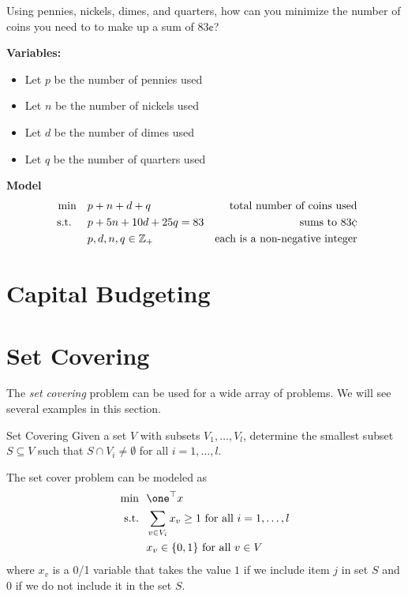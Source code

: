 \begin{example}
\label{ex:min-coins}
Using pennies, nickels, dimes, and quarters, how can you minimize the number of coins you need to to make up a sum of $83\cent$? 

\textbf{Variables:}
\begin{itemize}
\item Let $p$ be the number of pennies used
\item Let $n$ be the number of nickels used
\item Let $d$ be the number of dimes used
\item Let $q$ be the number of quarters used
\end{itemize}
\textbf{Model}
\begin{align*}
\min \quad & p + n + d + q & \text{ total number of coins used}\\
\text{ s.t. } \quad & p + 5n + 10d + 25 q = 83 & \text{sums to } 83 \cent\\
& p,d,n,q \in \Z_+ & \text{each is a non-negative integer}
\end{align*}
\end{example}
\section{Capital Budgeting}
\todoSection{}





\section{Set Covering}
\todoSection{}

The \emph{set covering} problem can be used for a wide array of problems.    We will see several examples in this section.

\begin{general}{Set Covering}{\npcomplete}
\label{general:set-covering}
Given a set $V$ with subsets $V_1, \dots, V_l$, determine the smallest subset $S \subseteq V$ such that 
$S \cap V_i \neq \emptyset$ for all $i=1, \dots, l$.

The set cover problem can be modeled as
\begin{equation}
\begin{split}
\min \ \ & \one^\top x\\
\text{s.t.} \ \ & \sum_{v \in V_i} x_v \geq 1 \text{ for all } i =1, \dots, l \\ 
& x_v \in \{0,1\} \text{ for all } v \in V
\end{split}
\end{equation}
where $x_v$ is a 0/1 variable that takes the value $1$ if we include item $j$ in set $S$ and $0$ if we do not include it in the set $S$.  
\end{general}



